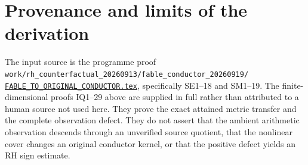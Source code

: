\documentclass[11pt]{article}
\begin{document}
\section{Provenance and limits of the derivation}
The input source is the programme proof
\texttt{work/rh\_counterfactual\_20260913/fable\_conductor\_20260919/}
\href{https://github.com/KokunoYumeto/zeta-function-research-reader/blob/5992ad50c0f2a06921f1fcaded7b4e38097c0739/workbenches/splitzero-tandem/continuations/20260920-original-kernel-mixed-determinants/providers/FABLE_TO_ORIGINAL_CONDUCTOR.tex\#L1}{\texttt{FABLE\_TO\_ORIGINAL\_CONDUCTOR.tex}}, specifically SE1--18 and
SM1--19.  The finite-dimensional proofs IQ1--29 above are supplied in
full rather than attributed to a human source not used here.  They
prove the exact attained metric transfer and the complete observation
defect.  They do not assert that the ambient arithmetic observation
descends through an unverified source quotient, that the nonlinear
cover changes an original conductor kernel, or that the positive
defect yields an RH sign estimate.
\end{document}
